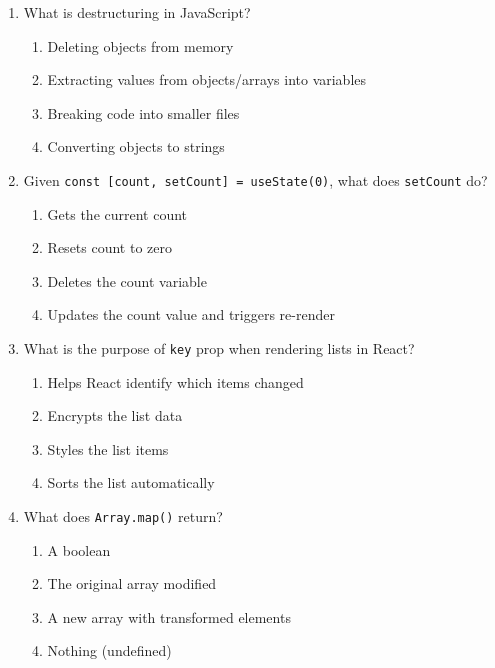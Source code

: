 \documentclass[12pt,a4paper]{article}
\begin{document}
\begin{enumerate}
\newpage
\section*{\textcolor{medium}{Section 2: Medium (Questions 31-60)}}

\item What is destructuring in JavaScript?
\begin{enumerate}[label=\Alph*)]
    \item Deleting objects from memory
    \item Extracting values from objects/arrays into variables
    \item Breaking code into smaller files
    \item Converting objects to strings
\end{enumerate}

\item Given \texttt{const [count, setCount] = useState(0)}, what does \texttt{setCount} do?
\begin{enumerate}[label=\Alph*)]
    \item Gets the current count
    \item Resets count to zero
    \item Deletes the count variable
    \item Updates the count value and triggers re-render
\end{enumerate}

\item What is the purpose of \texttt{key} prop when rendering lists in React?
\begin{enumerate}[label=\Alph*)]
    \item Helps React identify which items changed
    \item Encrypts the list data
    \item Styles the list items
    \item Sorts the list automatically
\end{enumerate}

\item What does \texttt{Array.map()} return?
\begin{enumerate}[label=\Alph*)]
    \item A boolean
    \item The original array modified
    \item A new array with transformed elements
    \item Nothing (undefined)
\end{enumerate}


\end{enumerate}
\end{document}
